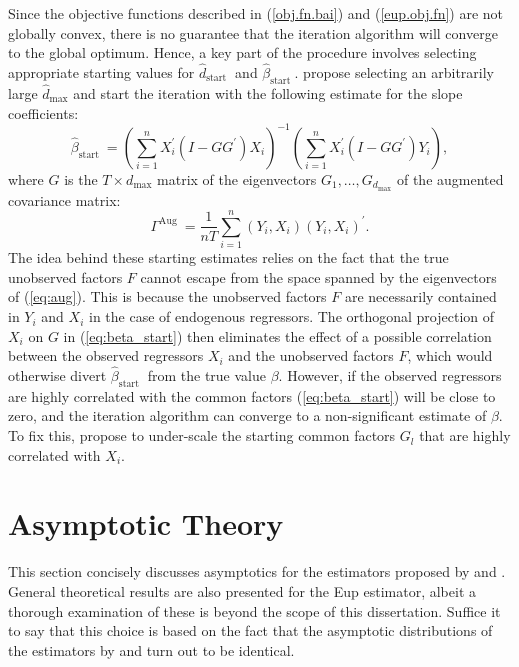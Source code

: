 Since the objective functions described in (\ref{obj.fn.bai}) and (\ref{eup.obj.fn}) are not globally convex, there is no guarantee that the iteration algorithm will converge to the global optimum. Hence, a key part of the procedure involves selecting appropriate starting values for $\hat{d}_{\text {start }}$ and $\hat{\beta}_{\text {start }}$. \citet{bada2014parameter} propose selecting an arbitrarily large $\hat{d}_{\text{max}}$ and start the iteration with  the following estimate for the slope coefficients: 
\begin{equation}\label{eq:beta_start}
    \hat{\beta}_{\text {start }}=\left(\sum_{i=1}^n X_i^{\prime}\left(I-G G^{\prime}\right) X_i\right)^{-1}\left(\sum_{i=1}^n X_i^{\prime}\left(I-G G^{\prime}\right) Y_i\right),
\end{equation}
where $G$ is the $T \times d_{\max }$ matrix of the eigenvectors $G_1, \ldots, G_{d_{\max }}$ of the augmented covariance matrix:
\begin{equation}\label{eq:aug}
    \Gamma^{\text {Aug }}=\frac{1}{n T} \sum_{i=1}^n\left(Y_i, X_i\right)\left(Y_i, X_i\right)^{\prime}.
\end{equation}
The idea behind these starting estimates relies on the fact that the true unobserved factors $F$ cannot escape from the space spanned by the eigenvectors of (\ref{eq:aug}). This is because the unobserved factors \( F \) are necessarily contained in $Y_i$ and $X_i$ in the case of endogenous regressors. The orthogonal projection of $X_i$ on $G$ in (\ref{eq:beta_start}) then eliminates the effect of a possible correlation between the observed regressors $X_i$ and the unobserved factors $F$, which would otherwise divert $\hat{\beta}_{\text {start }}$ from the true value $\beta$. However, if the observed regressors are highly correlated with the common factors (\ref{eq:beta_start})  will be close to zero, and the iteration algorithm can converge to a non-significant estimate of $\beta$. To fix this, \citet{bada2014parameter} propose to under-scale the starting common factors $G_l$ that are highly correlated with $X_i$.




\section{Asymptotic Theory}\label{asymptotics}

This section concisely discusses asymptotics for the estimators proposed by \citet{kneip2012new} and \citet{bai2009panel}. General theoretical results are also presented for the \ac{Eup} estimator, albeit a thorough examination of these is beyond the scope of this dissertation. Suffice it to say that this choice is based on the fact that the asymptotic distributions of the estimators by \citet{bai2009panel} and \citet{bada2014parameter} turn out to be identical.  
